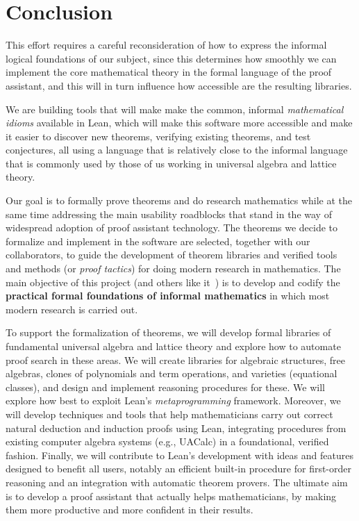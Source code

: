 \documentclass[12pt]{amsart}  %
\begin{document}
\section{Conclusion}

This effort requires a careful reconsideration of how to express the informal 
logical foundations of our subject, since this determines how smoothly 
we can implement the core mathematical theory in the formal language of the proof assistant,
and this will in turn influence how accessible are the resulting libraries.

We are building tools that will make make the common, informal \emph{mathematical idioms}
available in Lean, which will make this software more accessible and make it 
easier to discover new theorems, verifying existing theorems,
and test conjectures, all using a language that is relatively close to the informal 
language that is commonly used by those of us working in universal algebra and lattice theory.

Our goal is to formally prove theorems and do research mathematics while at the same time 
addressing the main usability roadblocks that stand in the way of widespread 
adoption of proof assistant technology.  The theorems we decide to formalize and implement in the software
are selected, together with our collaborators, to guide the development of 
theorem libraries and verified tools and methods (or \emph{proof tactics}) for doing 
modern research in mathematics.  The main objective of this project 
(and others like it~\cite{lean-mathlib:2018,blanchette:2018}) is to develop and codify 
the \textbf{practical formal foundations of informal mathematics} 
in which most modern research is carried out.

To support the formalization of theorems, we will develop formal libraries of fundamental universal algebra
and lattice theory and explore how to automate proof search in these areas. We will
create libraries for algebraic structures, free algebras, clones of polynomials and term operations, 
and varieties (equational classes), and design and implement reasoning procedures for these.
We will explore how best to exploit Lean's \emph{metaprogramming} framework. Moreover, we will develop 
techniques and tools that help mathematicians carry out correct natural deduction and induction 
proofs using Lean, integrating procedures from existing computer algebra systems (e.g., UACalc) in a foundational, 
verified fashion. Finally, we will contribute to Lean's development with ideas and features designed
to benefit all users, notably an efficient built-in procedure for first-order reasoning and an integration 
with automatic theorem provers. The ultimate aim is to develop a proof assistant that actually helps 
mathematicians, by making them more productive and more confident in their results.
\end{document}
